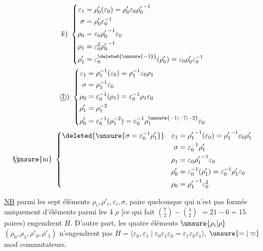 \[k)\ \left\{\begin{aligned}
\varepsilon_1&=\rho'_0(\varepsilon_0)=\rho'_0\varepsilon_0{\rho'_0}^{-1}\\
\sigma&=\rho'_0\varepsilon_0^{-1}\\
\rho_0&=\varepsilon_0{\rho'_0}^{-1}\varepsilon_0\\
\rho_1&=\varepsilon_0^2{\rho'_0}^{-1}\\
\rho'_1&=\varepsilon_0^{\deleted{\unsure{-1}}}(\rho'_0)=\varepsilon_0\rho'_0\varepsilon_0^{-1}
\end{aligned}\right.\]
\[\text{\textcircled{l})}\ \left\{\begin{aligned}
\varepsilon_1&=\rho_1^{-1}(\varepsilon_0)=\rho_1^{-1}\varepsilon_0\rho_1\\
\sigma&=\rho_1^{-1}\varepsilon_0\\
\rho_0&=\varepsilon_0^{-1}(\rho_1)=\varepsilon_0^{-1}\rho_1\varepsilon_0\\
\rho'_1&=\rho_1^{-2}\\
\rho'_0&=\varepsilon_0^{-1}(\rho_1^{-2})=\varepsilon_0^{-1}\rho_1^{\unsure{-1|-7|-2}}\varepsilon_0
\end{aligned}\right.\]
\[\text{\textcircled{\unsure{m}}}\ \left\{\begin{aligned}
\deleted{\unsure{\sigma=\varepsilon_0^{-1}\rho'_1}}\quad \varepsilon_1&={\rho'_1}^{-1}(\varepsilon_0)={\rho'_1}^{-1}\varepsilon_0\rho'_1\\
\sigma&=\varepsilon_0^{-1}\rho'_1\\
\rho_1&=\varepsilon_0{\rho'_1}^{-1}\varepsilon_0\\
\rho'_0&=\varepsilon_0^{-1}(\rho'_1)=\varepsilon_0^{-1}\rho'_1\varepsilon_0\\
\rho_0&={\rho'_1}^{-1}\varepsilon_0^2
\end{aligned}\right.\]

\uline{NB} parmi les sept éléments $\rho_i,\rho'_i,\varepsilon_i,\sigma$,  
paire quelconque qui n'est pas formée uniquement
d'éléments parmi les 4 $\rho$ [ce qui fait $\binom{7}{2}-\binom{4}{2}$
$=21-6=15$ paires) engendrent $H$. D'autre part,
les quatre éléments $\unsure{\rho_i|\rho}$ $(\rho_0,\rho_1,\rho'_0,\rho'_1)$ n'engendrent
pas $H=\langle \varepsilon_0,\varepsilon_1\mid \varepsilon_0\varepsilon_1\varepsilon_0=\varepsilon_1\varepsilon_0\varepsilon_1\rangle$,  $\unsure{=|\simeq}$ mod commutateurs.

